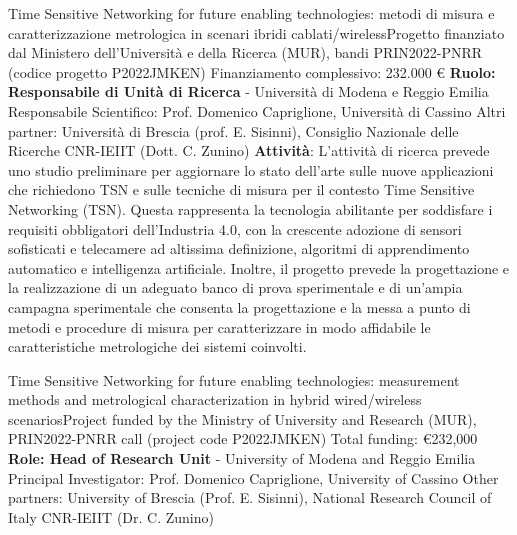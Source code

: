 {Time Sensitive Networking for future enabling technologies:
    metodi di misura e caratterizzazione metrologica in scenari ibridi
        cablati/wireless}{Progetto finanziato dal Ministero dell'Università e della Ricerca (MUR), bandi PRIN2022-PNRR (codice progetto P2022JMKEN)}
{\newline
    Finanziamento complessivo: 232.000 €\newline
	\textbf{Ruolo: Responsabile di Unità di Ricerca} - Università di Modena e Reggio Emilia\newline
	Responsabile Scientifico: Prof. Domenico Capriglione, Università di Cassino\newline
	Altri partner: Università di Brescia (prof. E. Sisinni), Consiglio Nazionale delle Ricerche CNR-IEIIT (Dott. C. Zunino)}
    {\textbf{Attività}: L'attività di ricerca prevede uno studio preliminare per aggiornare lo stato dell'arte sulle nuove applicazioni
    che richiedono TSN e sulle tecniche di misura per il contesto Time Sensitive Networking (TSN). Questa rappresenta la tecnologia abilitante per soddisfare i requisiti obbligatori dell'Industria 4.0, con la crescente adozione di sensori sofisticati e telecamere ad altissima definizione, algoritmi di apprendimento automatico e intelligenza artificiale. Inoltre, il progetto prevede la progettazione e la realizzazione di un adeguato banco di prova sperimentale e di un'ampia campagna sperimentale che consenta la progettazione e la messa a punto di metodi e procedure di misura
    per caratterizzare in modo affidabile le caratteristiche metrologiche dei sistemi coinvolti.}

     {Time Sensitive Networking for future enabling technologies:
          measurement methods and metrological characterization in hybrid
                wired/wireless scenarios}{Project funded by the Ministry of University and Research (MUR), PRIN2022-PNRR call (project code P2022JMKEN)}
     {\newline
          Total funding: €232,000\newline
          \textbf{Role: Head of Research Unit} - University of Modena and Reggio Emilia\newline
          Principal Investigator: Prof. Domenico Capriglione, University of Cassino\newline
          Other partners: University of Brescia (Prof. E. Sisinni), National Research Council of Italy CNR-IEIIT (Dr. C. Zunino)}
          {}
    
